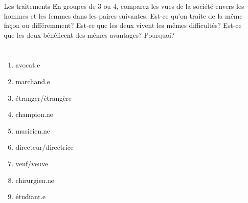 \begin{frame}{Les traitements}
  \small
  En groupes de 3 ou 4, comparez les vues de la société envers les hommes et les femmes dans les paires suivantes.
  Est-ce qu'on traite de la même façon ou différemment?
  Est-ce que les deux vivent  les mêmes difficultés?
  Est-ce que les deux bénéficent des mêmes avantages?
  Pourquoi?
  \begin{columns}
    \small
      \begin{enumerate}
        \item avocat.e
        \item marchand.e
        \item étranger/étrangère
        \item champion.ne
        \item musicien.ne
        \item directeur/directrice
        \item veuf/veuve
        \item chirurgien.ne
        \item étudiant.e
      \end{enumerate}
  \end{columns}
\end{frame}